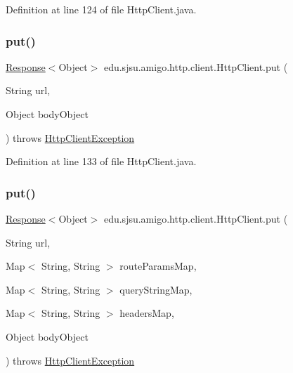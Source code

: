 Definition at line 124 of file Http\+Client.\+java.

\mbox{\label{classedu_1_1sjsu_1_1amigo_1_1http_1_1client_1_1_http_client_ac15f254786205f4289d1092be7be60b0}} 
\subsubsection{\texorpdfstring{put()}{put()}\hspace{0.1cm}{\footnotesize\ttfamily [1/2]}}
{\footnotesize\ttfamily \hyperlink{classedu_1_1sjsu_1_1amigo_1_1http_1_1client_1_1_response}{Response}$<$Object$>$ edu.\+sjsu.\+amigo.\+http.\+client.\+Http\+Client.\+put (\begin{DoxyParamCaption}\item[{String}]{url,  }\item[{Object}]{body\+Object }\end{DoxyParamCaption}) throws \hyperlink{classedu_1_1sjsu_1_1amigo_1_1http_1_1client_1_1_http_client_exception}{Http\+Client\+Exception}}



Definition at line 133 of file Http\+Client.\+java.

\mbox{\label{classedu_1_1sjsu_1_1amigo_1_1http_1_1client_1_1_http_client_a8978182148f2fdc3a391a3b674741973}} 
\subsubsection{\texorpdfstring{put()}{put()}\hspace{0.1cm}{\footnotesize\ttfamily [2/2]}}
{\footnotesize\ttfamily \hyperlink{classedu_1_1sjsu_1_1amigo_1_1http_1_1client_1_1_response}{Response}$<$Object$>$ edu.\+sjsu.\+amigo.\+http.\+client.\+Http\+Client.\+put (\begin{DoxyParamCaption}\item[{String}]{url,  }\item[{Map$<$ String, String $>$}]{route\+Params\+Map,  }\item[{Map$<$ String, String $>$}]{query\+String\+Map,  }\item[{Map$<$ String, String $>$}]{headers\+Map,  }\item[{Object}]{body\+Object }\end{DoxyParamCaption}) throws \hyperlink{classedu_1_1sjsu_1_1amigo_1_1http_1_1client_1_1_http_client_exception}{Http\+Client\+Exception}}



